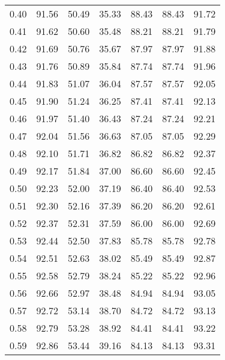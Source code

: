 \begin{tabular}{|c|c|c|c|c|c|c|}
      0.40 &     91.56 &     50.49 &      35.33 &   88.43 &      88.43 &         91.72 \\
      0.41 &     91.62 &     50.60 &      35.48 &   88.21 &      88.21 &         91.79 \\
      0.42 &     91.69 &     50.76 &      35.67 &   87.97 &      87.97 &         91.88 \\
      0.43 &     91.76 &     50.89 &      35.84 &   87.74 &      87.74 &         91.96 \\
      0.44 &     91.83 &     51.07 &      36.04 &   87.57 &      87.57 &         92.05 \\
      0.45 &     91.90 &     51.24 &      36.25 &   87.41 &      87.41 &         92.13 \\
      0.46 &     91.97 &     51.40 &      36.43 &   87.24 &      87.24 &         92.21 \\
      0.47 &     92.04 &     51.56 &      36.63 &   87.05 &      87.05 &         92.29 \\
      0.48 &     92.10 &     51.71 &      36.82 &   86.82 &      86.82 &         92.37 \\
      0.49 &     92.17 &     51.84 &      37.00 &   86.60 &      86.60 &         92.45 \\
      0.50 &     92.23 &     52.00 &      37.19 &   86.40 &      86.40 &         92.53 \\
      0.51 &     92.30 &     52.16 &      37.39 &   86.20 &      86.20 &         92.61 \\
      0.52 &     92.37 &     52.31 &      37.59 &   86.00 &      86.00 &         92.69 \\
      0.53 &     92.44 &     52.50 &      37.83 &   85.78 &      85.78 &         92.78 \\
      0.54 &     92.51 &     52.63 &      38.02 &   85.49 &      85.49 &         92.87 \\
      0.55 &     92.58 &     52.79 &      38.24 &   85.22 &      85.22 &         92.96 \\
      0.56 &     92.66 &     52.97 &      38.48 &   84.94 &      84.94 &         93.05 \\
      0.57 &     92.72 &     53.14 &      38.70 &   84.72 &      84.72 &         93.13 \\
      0.58 &     92.79 &     53.28 &      38.92 &   84.41 &      84.41 &         93.22 \\
      0.59 &     92.86 &     53.44 &      39.16 &   84.13 &      84.13 &         93.31 \\

\end{tabular}
